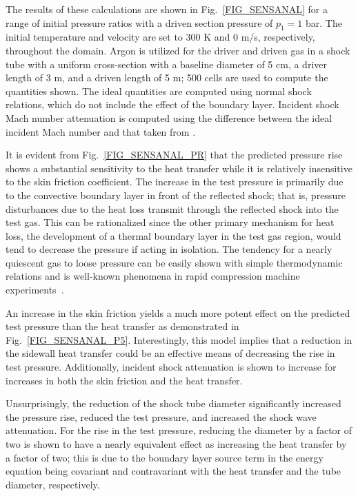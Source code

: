 The results of these calculations are shown in Fig.~\ref{FIG_SENSANAL} for a range of initial pressure ratios with a driven section pressure of $p_1=1$ bar. The initial temperature and velocity are set to 300 K and 0 m/s, respectively, throughout the domain. Argon is utilized for the driver and driven gas in a shock tube with a uniform cross-section with a baseline diameter of 5 cm, a driver length of 3 m, and a driven length of 5 m; 500 cells are used to compute the quantities shown. The ideal quantities are computed using normal shock relations, which do not include the effect of the boundary layer. Incident shock Mach number attenuation is computed using the difference between the ideal incident Mach number and that taken from \stnshk.

It is evident from Fig.~\ref{FIG_SENSANAL_PR} that the predicted pressure rise shows a substantial sensitivity to the heat transfer while it is relatively insensitive to the skin friction coefficient. The increase in the test pressure is primarily due to the convective boundary layer in front of the reflected shock; that is, pressure disturbances due to the heat loss transmit through the reflected shock into the test gas. This can be rationalized since the other primary mechanism for heat loss, the development of a thermal boundary layer in the test gas region, would tend to decrease the pressure if acting in isolation. The tendency for a nearly quiescent gas to loose pressure can be easily shown with simple thermodynamic relations and is well-known phenomena in rapid compression machine experiments~\cite{SUNG_CURRAN_PECS2014}.


An increase in the skin friction yields a much more potent effect on the predicted test pressure than the heat transfer as demonstrated in Fig.~\ref{FIG_SENSANAL_P5}. Interestingly, this model implies that a reduction in the sidewall heat transfer could be an effective means of decreasing the rise in test pressure. Additionally, incident shock attenuation is shown to increase for increases in both the skin friction and the heat transfer.

 Unsurprisingly, the reduction of the shock tube diameter significantly increased the pressure rise, reduced the test pressure, and increased the shock wave attenuation. For the rise in the test pressure, reducing the diameter by a factor of two is shown to have a nearly equivalent effect as increasing the heat transfer by a factor of two; this is due to the boundary layer source term in the energy equation being covariant and contravariant with the heat transfer and the tube diameter, respectively. 


